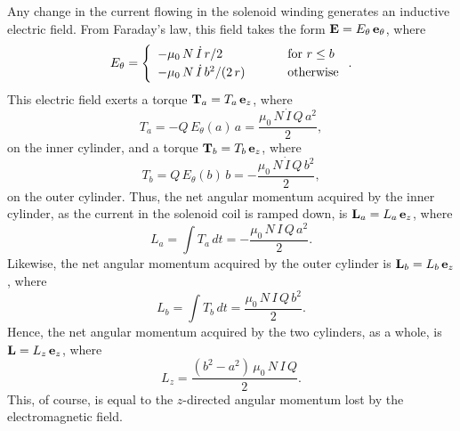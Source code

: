 Any change in the current flowing in the solenoid winding generates
an inductive electric field. From Faraday's law, this field
takes the form ${\bf E} = E_\theta\,{\bf e}_\theta$, where
\begin{equation}
E_\theta = \left\{
\begin{array}{lcl}
-\mu_0\,N\,\dot{I}\,r/2 &\mbox{\hspace{0.5cm}}&\mbox{for $r\leq b$}
\\[0.5ex]
-\mu_0\,N\,\dot{I}\,b^2/(2\,r)&&\mbox{otherwise}
\end{array}
 \right..
\end{equation}
This electric field exerts a  torque ${\bf T}_a=T_a\,{\bf e}_z$, where
\begin{equation}
T_a = -Q\,E_\theta(a)\,a = \frac{\mu_0\,N\,\dot{I}\,Q\,a^2}{2},
\end{equation}
on the inner cylinder, and a  torque ${\bf T}_b=T_b\,{\bf e}_z$, where
\begin{equation}
T_b= Q\,E_\theta(b)\,b =- \frac{\mu_0\,N\,\dot{I}\,Q\,b^2}{2},
\end{equation}
on the outer cylinder. Thus, the net angular momentum
acquired by the inner cylinder, as the current in the solenoid coil
is ramped down, is ${\bf L}_a=L_a\,{\bf e}_z$, where
\begin{equation}
L_a = \int T_a\,dt =  -\frac{\mu_0\,N\,I\,Q\,a^2}{2}.
\end{equation}
Likewise, the net angular momentum acquired by the outer cylinder is
${\bf L}_b = L_b\,{\bf e}_z$, where
\begin{equation}
L_b = \int T_b\,dt =  \frac{\mu_0\,N\,I\,Q\,b^2}{2}.
\end{equation}
Hence, the net angular momentum acquired by the two cylinders,
as a whole, is ${\bf L} = L_z\,{\bf e}_z$, where
\begin{equation}
L_z = \frac{(b^2-a^2)\,\mu_0\,N\,I\,Q}{2}.
\end{equation}
This, of course, is equal to the $z$-directed angular momentum lost
by the electromagnetic field.

